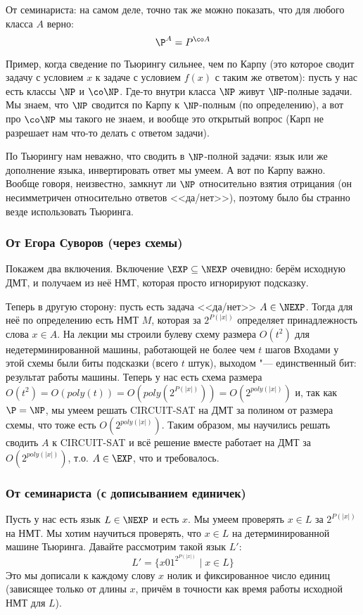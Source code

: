 	\begin{Rem}
		От семинариста: на самом деле, точно так же можно показать, что для любого
		класса $A$ верно:
		\[ \P^A = P^{\co A} \]
	\end{Rem}
	\begin{Rem}\label{task_14_rem_turing}
		Пример, когда сведение по Тьюрингу сильнее, чем по Карпу (это которое сводит задачу
		с условием $x$ к задаче с условием $f(x)$ с таким же ответом):
		пусть у нас есть классы $\NP$ и $\co\NP$.
		Где-то внутри класса $\NP$ живут $\NP$-полные задачи.
		Мы знаем, что $\NP$ сводится по Карпу к $\NP$-полным (по определению),
		а вот про $\co\NP$ мы такого не знаем, и вообще это открытый вопрос (Карп не разрешает нам что-то делать
		с ответом задачи).

		По Тьюрингу нам неважно, что сводить в $\NP$-полной задачи: язык или же дополнение языка,
		инвертировать ответ мы умеем.
		А вот по Карпу важно.
		Вообще говоря, неизвестно, замкнут ли $\NP$ относительно взятия отрицания (он несимметричен относительно
		ответов <<да/нет>>), поэтому было бы странно везде использовать Тьюринга.
	\end{Rem}

	\subsubsection{От Егора Суворов (через схемы)}
		Покажем два включения.
		Включение $\EXP \subseteq \NEXP$ очевидно: берём исходную ДМТ, и получаем
		из неё НМТ, которая просто игнорируют подсказку.

		Теперь в другую сторону: пусть есть задача <<да/нет>> $A \in \NEXP$.
		Тогда для неё по определению есть НМТ $M$, которая за $2^{P(|x|)}$ определяет
		принадлежность слова $x \in A$.
		На лекции мы строили булеву схему размера $O(t^2)$ для недетерминированной машины, работающей не более чем $t$ шагов
		Входами у этой схемы были биты подсказки (всего $t$ штук), выходом "--- единственный бит: результат работы машины.
		Теперь у нас есть схема размера $O(t^2)=O(poly(t))=O(poly(2^{P(|x|)}))=O(2^{poly(|x|)})$ и,
		так как $\P=\NP$, мы умеем решать CIRCUIT-SAT на ДМТ за полином от размера схемы, что тоже есть $O(2^{poly(|x|)})$.
		Таким образом, мы научились решать сводить $A$ к CIRCUIT-SAT и всё решение вместе работает на ДМТ
		за $O(2^{poly(|x|)})$, т.о. $A \in \EXP$, что и требовалось.

	\subsubsection{От семинариста (с дописыванием единичек)}\label{prob13_sol2}
		Пусть у нас есть язык $L \in \NEXP$ и есть $x$.
		Мы умеем проверять $x \in L$ за $2^{P(|x|)}$ на НМТ.
		Мы хотим научиться проверять, что $x\in L$ на детерминированной машине Тьюринга.
		Давайте рассмотрим такой язык $L'$:
		\[ L' = \{ x 0 1^{2^{P(|x|)}} \mid x \in L \} \]
		Это мы дописали к каждому слову $x$ нолик и фиксированное число единиц (зависящее только от длины $x$,
		причём в точности как время работы исходной НМТ для $L$).

